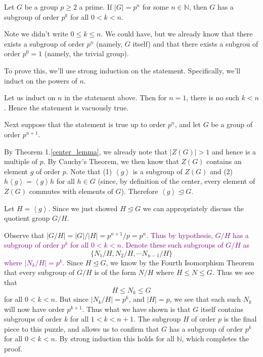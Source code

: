 \documentclass[12pt,letterpaper]{algebra_book}
\newcommand{\normal}{\unlhd}
\theoremstyle{definition}
\begin{document}
    \begin{thm}
        Let $G$ be a group $p \ge 2$ a prime. If $|G| = p^n$ for some
        $n \in \mathbb{N}$, then $G$ has a subgroup of order $p^k$ for
        all $0 < k < n$.
    \end{thm}
    Note we didn't write $ 0 \le k \le n$. We could have, but we already
        know that there exists a subgroup of order $p^n$ (namely, $G$
        itself) and that there exists a subgrou of order $p^0 = 1$
        (namely, the trivial group).
    \begin{prf}
        \textcolor{NavyBlue}{To prove this, we'll use strong induction
        on the statement. Specifically, we'll induct on the powers of
        $n$.}

        Let us induct on $n$ in the statement above. Then for $n = 1$,
        there is no such $k < n$. Hence the statement is vacuously
        true. 

        Next suppose that the statement is true up to order $p^n$, 
        and let $G$ be a group of order $p^{n+1}$. 

        By Theorem 1.\ref{center_lemma}, we already note that $|Z(G)| >
        1$ and hence is a multiple of $p$. By Cauchy's Theorem, we
        then know that $Z(G)$ contains an element $g$ of order $p$.
        Note that (1) $\left< g\right>$ is a subgroup of $Z(G)$ and
        (2) $h\left< g \right> = \left< g \right>h$ for all $h \in G$
        (since, by definition of the center, every element of $Z(G)$
        commutes with elements of $G$). Therefore $\left< g \right>
        \normal G$. 

        Let $H = \left< g \right>$. Since we just showed $H \normal G$
        we can appropriately discuss the quotient group $G/H$.

        Observe that $|G/H| = |G|/|H| = p^{n+1}/p = p^n$. \textcolor{purple}{Thus by hypothesis, $G/H$ has a
        subgroup of order $p^k$ for all $0 < k < n$. Denote these such
        subgroups of $G/H$ as}
        \[
            \{N_1/H, N_2/H, \cdots N_{n-1}/H\}
        \]
        \textcolor{purple}{where $|N_k/H| = p^k$.}
        Since $H \normal G$, we
        know by the Fourth Isomorphism Theorem that every subgroup of
        $G/H$ is of the form $N/H$ where $H \le N \le G$. Thus we see
        that 
        \[
            H \le N_k \le G
        \]
        for all $0 < k < n$. But since $|N_k/H| = p^k$, and $|H| = p$,
        we see that each such $N_k$ will now have order $p^{k+1}$.
        Thus what we have shown is that $G$ itself contains subgroups
        of order $k$ for all $1 < k < n+1$. The subgroup $H$ of order
        $p$ is the final piece to this puzzle, and allows us to
        confirm that $G$ has a subgroup of order $p^k$ for all $0 < k < n$.
        By strong induction this holds for all $\mathbb{N}$,
        which completes the proof.
    \end{prf}
\end{document}
